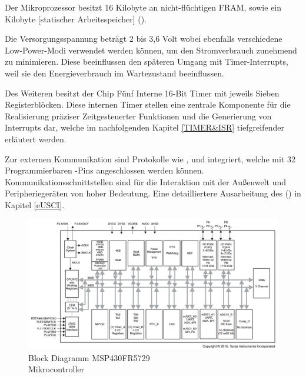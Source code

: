 Der Mikroprozessor besitzt 16 Kilobyte an nicht-fl\"uchtigen FRAM, sowie ein Kilobyte [statischer Arbeitsspeicher] (). 

Die Versorgungsspannung betr\"agt 2 bis 3,6 Volt wobei ebenfalls verschiedene Low-Power-Modi verwendet werden k\"onnen, um den Stromverbrauch zunehmend zu minimieren. Diese beeinflussen den sp\"ateren Umgang mit Timer-Interrupts, weil sie den Energieverbrauch im Wartezustand beeinflussen. 

Des Weiteren besitzt der Chip F\"unf Interne 16-Bit Timer mit jeweils Sieben\\ Registerbl\"ocken. Diese internen Timer stellen eine zentrale Komponente f\"ur die Realisierung pr\"aziser Zeitgesteuerter Funktionen und die Generierung von Interrupts dar, welche im nachfolgenden Kapitel \ref{TIMER&ISR} tiefgreifender erl\"autert werden.

Zur externen Kommunikation sind Protokolle wie ,  und  integriert, welche mit 32 Programmierbaren -Pins angeschlossen werden k\"onnen. Kommunikationsschnittstellen sind f\"ur die Interaktion mit der Au{\ss}enwelt und Peripherieger\"aten von hoher Bedeutung. Eine detailliertere Ausarbeitung des  () in Kapitel \ref{eUSCI}. 

\begin{figure}[h!]
	\centering
	\includegraphics[width=1.0\textwidth]{../Bilder/FunctionalBlockDiagram_MSP430FR5729.png}
	\caption{Block Diagramm MSP430FR5729\\Mikrocontroller {}}
	\label{fig:BlockDiagramm_msp430}
\end{figure}

